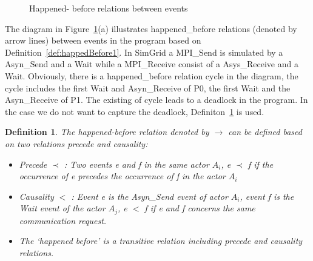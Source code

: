 \documentclass[a4paper,11pt]{article}
\newtheorem{definition}{Definition}
\begin{document}
 \begin{figure}[H]
\label{fig:hapend_before}
\hfill
{}
\caption{Happened- before relations between events}
\end{figure}	
The diagram in Figure~\ref{fig:hapend_before}(a) illustrates happened\_before relations (denoted by arrow lines)  between events in the program based on Definition~\ref{def:happedBefore1}. In SimGrid a MPI\_Send is simulated by a Asyn\_Send and a Wait while a MPI\_Receive consist of a Asys\_Receive and a Wait. Obviously, there is a happened\_before relation cycle in the diagram, the cycle includes the first Wait and Asyn\_Receive of P0, the first Wait and the Asyn\_Receive of P1. The existing of cycle leads to a deadlock in the program. In the case we do not want to capture the deadlock, Definiton~\ref{def:happedBefore2} is used.

\begin{definition}
	  	\label{def:happedBefore2}
	The happened-before relation  denoted by  $\rightarrow $ can be defined based on two relations precede and causality: \begin{itemize}
		\item Precede $ \prec$ :  Two events e and f in the same actor $A_i$, e $ \prec$ f if the occurrence of e precedes the occurrence of f in the actor $A_i$  
		\item Causality $<$ : Event e is the Asyn\_Send event of actor $A_i$, event f is the Wait event of the actor $A_j$,  e $<$ f if e and f concerns the same communication request.
		\item The ‘happened before’ is a transitive relation including precede and causality relations. 
	\end{itemize}\end{definition} 
\end{document}
